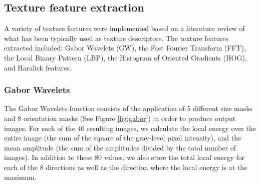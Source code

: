 \subsection{Texture feature extraction}

A variety of texture features were implemented based on a literature review of what has been typically used as texture descriptors.
The texture features extracted included: Gabor Wavelets\cite{Zheng_2004} (GW), the Fast Fourier Transform (FFT), the Local Binary Pattern (LBP), the Histogram of Oriented Gradients (HOG), and Haralick features.

\subsubsection{Gabor Wavelets}

The Gabor Wavelets function consists of the application of 5 different size masks and 8 orientation masks (See Figure \ref{fig:gabor}) in order to produce output images. For each of the 40 resulting images, we calculate the local energy over the entire image (the sum of the square of the gray-level pixel intensity), and the mean amplitude (the sum of the amplitudes divided by the total number of images). In addition to these 80 values, we also store the total local energy for each of the 8 directions as well as the direction where the local energy is at the maximum.

  
  
  
  